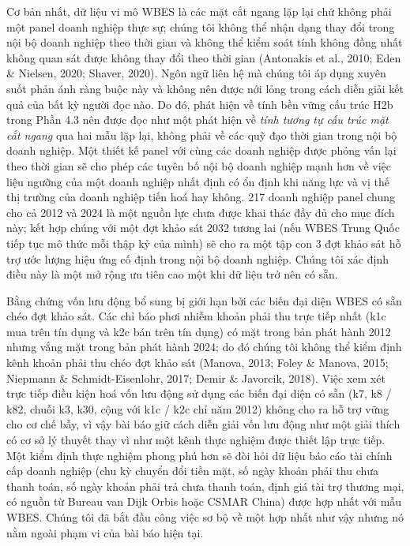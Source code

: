 \documentclass[12pt,a4paper]{article}
\begin{document}
Cơ bản nhất, dữ liệu vi mô WBES là các mặt cắt ngang lặp lại chứ không
phải một panel doanh nghiệp thực sự; chúng tôi không thể nhận dạng thay
đổi trong nội bộ doanh nghiệp theo thời gian và không thể kiểm soát tính
không đồng nhất không quan sát được không thay đổi theo thời gian
(Antonakis et al., 2010; Eden \& Nielsen, 2020; Shaver, 2020). Ngôn ngữ
liên hệ mà chúng tôi áp dụng xuyên suốt phản ánh ràng buộc này và không
nên được nới lỏng trong cách diễn giải kết quả của bất kỳ người đọc nào.
Do đó, phát hiện về tính bền vững cấu trúc H2b trong Phần 4.3 nên được
đọc như một phát hiện về \emph{tính tương tự cấu trúc mặt cắt ngang} qua
hai mẫu lặp lại, không phải về các quỹ đạo thời gian trong nội bộ doanh
nghiệp. Một thiết kế panel với cùng các doanh nghiệp được phỏng vấn lại
theo thời gian sẽ cho phép các tuyên bố nội bộ doanh nghiệp mạnh hơn về
việc liệu ngưỡng của một doanh nghiệp nhất định có ổn định khi năng lực
và vị thế thị trường của doanh nghiệp tiến hoá hay không. 217 doanh
nghiệp panel chung cho cả 2012 và 2024 là một nguồn lực chưa được khai
thác đầy đủ cho mục đích này; kết hợp chúng với một đợt khảo sát 2032
tương lai (nếu WBES Trung Quốc tiếp tục mô thức mỗi thập kỷ của mình) sẽ
cho ra một tập con 3 đợt khảo sát hỗ trợ ước lượng hiệu ứng cố định
trong nội bộ doanh nghiệp. Chúng tôi xác định điều này là một mở rộng ưu
tiên cao một khi dữ liệu trở nên có sẵn.

Bằng chứng vốn lưu động bổ sung bị giới hạn bởi các biến đại diện WBES
có sẵn chéo đợt khảo sát. Các chỉ báo phơi nhiễm khoản phải thu trực
tiếp nhất (k1c mua trên tín dụng và k2c bán trên tín dụng) có mặt trong
bản phát hành 2012 nhưng vắng mặt trong bản phát hành 2024; do đó chúng
tôi không thể kiểm định kênh khoản phải thu chéo đợt khảo sát (Manova,
2013; Foley \& Manova, 2015; Niepmann \& Schmidt-Eisenlohr, 2017; Demir
\& Javorcik, 2018). Việc xem xét trực tiếp điều kiện hoá vốn lưu động sử
dụng các biến đại diện có sẵn (k7, k8 / k82, chuỗi k3, k30, cộng với k1c
/ k2c chỉ năm 2012) không cho ra hỗ trợ vững cho cơ chế bẫy, vì vậy bài
báo giữ cách diễn giải vốn lưu động như một giải thích có cơ sở lý
thuyết thay vì như một kênh thực nghiệm được thiết lập trực tiếp. Một
kiểm định thực nghiệm phong phú hơn sẽ đòi hỏi dữ liệu báo cáo tài chính
cấp doanh nghiệp (chu kỳ chuyển đổi tiền mặt, số ngày khoản phải thu
chưa thanh toán, số ngày khoản phải trả chưa thanh toán, định giá tài
trợ thương mại, có nguồn từ Bureau van Dijk Orbis hoặc CSMAR China) được
hợp nhất với mẫu WBES. Chúng tôi đã bắt đầu công việc sơ bộ về một hợp
nhất như vậy nhưng nó nằm ngoài phạm vi của bài báo hiện tại.
\end{document}
